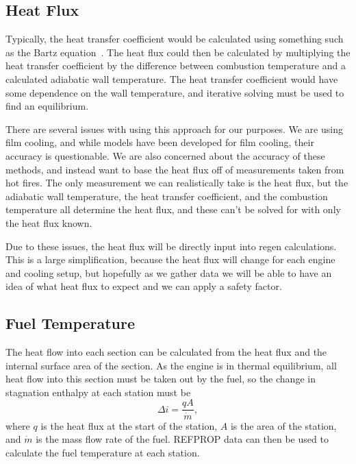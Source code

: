 \documentclass[11pt]{article}
\begin{document}
\subsection{Heat Flux}
Typically, the heat transfer coefficient would be calculated using something such as the Bartz equation~\cite{bartz_turbulent_1965}. The heat flux could then be calculated by multiplying the heat transfer coefficient by the difference between combustion temperature and a calculated adiabatic wall temperature. The heat transfer coefficient would have some dependence on the wall temperature, and iterative solving must be used to find an equilibrium.

There are several issues with using this approach for our purposes. We are using film cooling, and while models have been developed for film cooling, their accuracy is questionable. We are also concerned about the accuracy of these methods, and instead want to base the heat flux off of measurements taken from hot fires. The only measurement we can realistically take is the heat flux, but the adiabatic wall temperature, the heat transfer coefficient, and the combustion temperature all determine the heat flux, and these can't be solved for with only the heat flux known.

Due to these issues, the heat flux will be directly input into regen calculations. This is a large simplification, because the heat flux will change for each engine and cooling setup, but hopefully as we gather data we will be able to have an idea of what heat flux to expect and we can apply a safety factor.

\subsection{Fuel Temperature}
The heat flow into each section can be calculated from the heat flux and the internal surface area of the section. As the engine is in thermal equilibrium, all heat flow into this section must be taken out by the fuel, so the change in stagnation enthalpy at each station must be~\cite{naraghi_simple_2008}
\begin{equation}
  \Delta i = \frac{q A}{\dot{m}},
\end{equation}
where $q$ is the heat flux at the start of the station, $A$ is the area of the station, and $\dot{m}$ is the mass flow rate of the fuel. REFPROP data can then be used to calculate the fuel temperature at each station.
\end{document}
